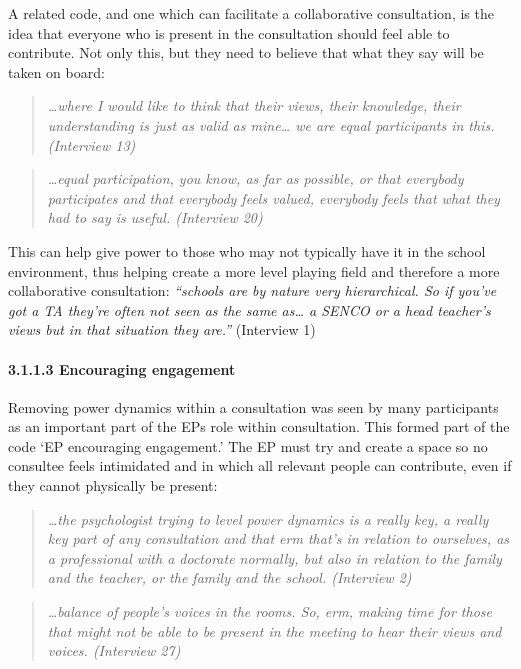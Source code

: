 \documentclass[
  english,
  man]{apa}
\let\oldparagraph\paragraph
\renewcommand{\paragraph}[1]{\oldparagraph{#1}\mbox{}}
\begin{document}
A related code, and one which can facilitate a collaborative consultation, is the idea that everyone who is present in the consultation should feel able to contribute. Not only this, but they need to believe that what they say will be taken on board:

\begin{quote}
\emph{\ldots where I would like to think that their views, their knowledge, their
understanding is just as valid as mine\ldots{} we are equal participants in
this. (Interview 13)}
\end{quote}

\begin{quote}
\emph{\ldots equal participation, you know, as far as possible, or that everybody
participates and that everybody feels valued, everybody feels that
what they had to say is useful. (Interview 20)}
\end{quote}

This can help give power to those who may not typically have it in the school environment, thus helping create a more level playing field and therefore a more collaborative consultation: \emph{``schools are by nature very hierarchical. So if you've got a TA they're often not seen as the same as\ldots{} a SENCO or a head teacher's views but in that situation they are.''} (Interview 1)

\hypertarget{encouraging-engagement}{%
\paragraph{3.1.1.3 Encouraging engagement}\label{encouraging-engagement}}

Removing power dynamics within a consultation was seen by many participants as an important part of the EPs role within consultation. This formed part of the code `EP encouraging engagement.' The EP must try and create a space so no consultee feels intimidated and in which all relevant people can contribute, even if they cannot physically be present:

\begin{quote}
\emph{\ldots the psychologist trying to level power dynamics is a really key, a
really key part of any consultation and that erm that's in relation to
ourselves, as a professional with a doctorate normally, but also in
relation to the family and the teacher, or the family and the school.
(Interview 2)}
\end{quote}

\begin{quote}
\emph{\ldots balance of people's voices in the rooms. So, erm, making time for
those that might not be able to be present in the meeting to hear
their views and voices. (Interview 27)}
\end{quote}
\end{document}
